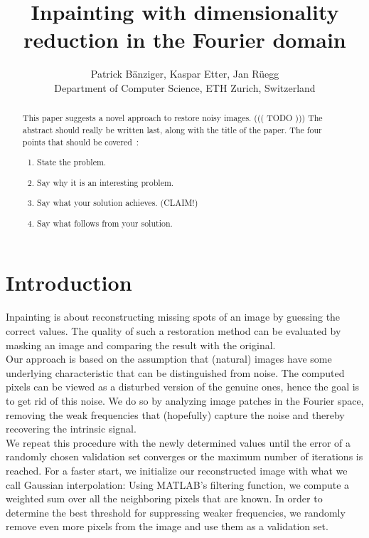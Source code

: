 \documentclass[10pt,conference,compsocconf]{IEEEtran}
\begin{document}
\title{Inpainting with dimensionality reduction in the Fourier domain}

\author{
  Patrick Bänziger, Kaspar Etter, Jan Rüegg\\
  Department of Computer Science, ETH Zurich, Switzerland
}

\maketitle

\begin{abstract}
  This paper suggests a novel approach to restore noisy images.
  ((( TODO )))
  The abstract should really be written last, along with the title of
the paper. The four points that should be covered~\cite{jones08}:
\begin{enumerate}
\item State the problem.
\item Say why it is an interesting problem.
\item Say what your solution achieves. (CLAIM!)
\item Say what follows from your solution.
\end{enumerate}
\end{abstract}

\section{Introduction}
Inpainting is about reconstructing missing spots of an image by guessing the correct values. The quality of such a restoration method can be evaluated by masking an image and comparing the result with the original.\\
Our approach is based on the assumption that (natural) images have some underlying characteristic that can be distinguished from noise. The computed pixels can be viewed as a disturbed version of the genuine ones, hence the goal is to get rid of this noise. We do so by analyzing image patches in the Fourier space, removing the weak frequencies that (hopefully) capture the noise and thereby recovering the intrinsic signal.\\
We repeat this procedure with the newly determined values until the error of a randomly chosen validation set converges or the maximum number of iterations is reached. For a faster start, we initialize our reconstructed image with what we call Gaussian interpolation: Using MATLAB's filtering function, we compute a weighted sum over all the neighboring pixels that are known. In order to determine the best threshold for suppressing weaker frequencies, we randomly remove even more pixels from the image and use them as a validation set.
\end{document}
